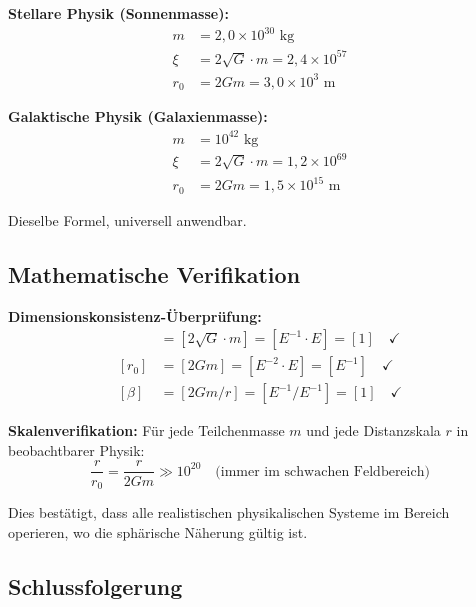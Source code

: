 \documentclass[12pt,a4paper]{article}
\begin{document}
\textbf{Stellare Physik (Sonnenmasse):}
\begin{align}
	m &= 2,0 \times 10^{30} \text{ kg} \\
	\xi &= 2\sqrt{G} \cdot m = 2,4 \times 10^{57} \\
	r_0 &= 2Gm = 3,0 \times 10^{3} \text{ m}
\end{align}

\textbf{Galaktische Physik (Galaxienmasse):}
\begin{align}
	m &= 10^{42} \text{ kg} \\
	\xi &= 2\sqrt{G} \cdot m = 1,2 \times 10^{69} \\
	r_0 &= 2Gm = 1,5 \times 10^{15} \text{ m}
\end{align}

Dieselbe Formel, universell anwendbar.

\subsection{Mathematische Verifikation}
\label{subsec:mathematical_verification}

\textbf{Dimensionskonsistenz-Überprüfung:}
\begin{align}
	[\xi] &= [2\sqrt{G} \cdot m] = [E^{-1} \cdot E] = [1] \quad \checkmark \\
	[r_0] &= [2Gm] = [E^{-2} \cdot E] = [E^{-1}] \quad \checkmark \\
	[\beta] &= [2Gm/r] = [E^{-1}/E^{-1}] = [1] \quad \checkmark
\end{align}

\textbf{Skalenverifikation:}
Für jede Teilchenmasse $m$ und jede Distanzskala $r$ in beobachtbarer Physik:
\begin{equation}
	\frac{r}{r_0} = \frac{r}{2Gm} \gg 10^{20} \quad \text{(immer im schwachen Feldbereich)}
\end{equation}

Dies bestätigt, dass alle realistischen physikalischen Systeme im Bereich operieren, wo die sphärische Näherung gültig ist.

\subsection{Schlussfolgerung}
\label{subsec:model_choice_conclusion}
\end{document}
